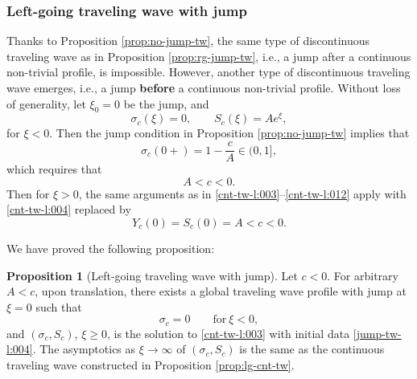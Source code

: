 \documentclass[12pt]{article}
\theoremstyle{definition}
\newtheorem{proposition}[theorem]{Proposition}
\theoremstyle{remark}
\numberwithin{equation}{section}
\begin{document}
\subsubsection{Left-going traveling wave with jump}
\label{subsub:lg-jump-tw}
Thanks to Proposition \ref{prop:no-jump-tw}, the same type of discontinuous traveling wave as in Proposition \ref{prop:rg-jump-tw}, i.e., a jump after a continuous non-trivial profile, is impossible. However, another type of discontinuous traveling wave emerges, i.e., a jump {\bf before} a continuous non-trivial profile. Without loss of generality, let $ \xi_0 = 0 $ be the jump, and 
\begin{equation}
    \label{jump-tw-l:001}
    \sigma_c(\xi) = 0, \qquad S_c(\xi) = Ae^\xi,
\end{equation}
for $ \xi< 0 $.
Then the jump condition in Proposition \ref{prop:no-jump-tw} implies that
\begin{equation}
    \label{jump-tw-l:002}
    \sigma_c(0+) = 1 - \frac{c}{A} \in (0,1],
\end{equation}
which requires that 
\begin{equation}
    \label{jump-tw-l:003}
    A < c < 0.
\end{equation}
Then for $ \xi >0 $, the same arguments as in \eqref{cnt-tw-l:003}--\eqref{cnt-tw-l:012} apply with \eqref{cnt-tw-l:004} replaced by
\begin{equation}
    \label{jump-tw-l:004}
    Y_c(0) = S_c(0) = A < c < 0. 
\end{equation}

We have proved the following proposition:
\begin{proposition}[Left-going traveling wave with jump] 
    \label{prop:lg-jump-tw}
    Let $ c <0 $. For arbitrary $ A < c $, upon translation, there exists a global traveling wave profile with jump at $ \xi = 0 $ such that
    \begin{equation}
        \sigma_c = 0 \qquad \text{for} \ \xi <0,
    \end{equation}
    and $ (\sigma_c, S_c) $, $ \xi \geq 0 $, is the solution to \eqref{cnt-tw-l:003} with initial data \eqref{jump-tw-l:004}. The asymptotics as $ \xi \rightarrow \infty $ of $ (\sigma_c, S_c) $ is the same as the continuous traveling wave constructed in Proposition \ref{prop:lg-cnt-tw}.
\end{proposition}
\end{document}
